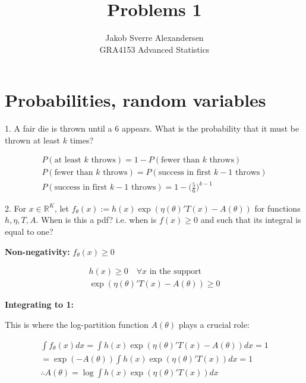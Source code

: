 \documentclass[10pt]{article}
\begin{document}
 
\title{Problems 1}
\author{Jakob Sverre Alexandersen\\
GRA4153 Advanced Statistics}
\maketitle

\tableofcontents
\newpage

\section{Probabilities, random variables}

1. A fair die is thrown until a 6 appears. What is the probability that 
it must be thrown at least $k$ times?

\begin{gather*}
    P(\text{at least $k$ throws}) = 1 - P(\text{fewer than $k$ throws}) \\
    P(\text{fewer than $k$ throws}) = P(\text{success in first $k-1$ throws}) \\
    P(\text{success in first $k-1$ throws}) = 1 - \Big(\frac{5}{6}\Big)^{k - 1}
\end{gather*}

\hfill 

2. For $x \in \mathbb{R}^K$, let $f_\theta(x) :=h(x) \exp(\eta(\theta)'T(x) - A(\theta))$ for functions $h, \eta, T, A$. When 
is this a pdf? i.e. when is $f(x) \geq 0$ and such that its integral is equal to one?

\textbf{Non-negativity: } $f_\theta(x) \geq 0$

\begin{gather*}
    h(x) \geq 0 \quad\forall x \text{ in the support}\\
    \exp(\eta(\theta)'T(x) - A(\theta)) \geq 0
\end{gather*}

\textbf{Integrating to 1: }

This is where the log-partition function $A(\theta)$ plays a crucial role:

\begin{gather*}
    \int f_\theta(x) dx = \int h(x) \exp (\eta(\theta)'T(x) - A(\theta)) dx = 1\\
    = \exp(-A(\theta)) \int h(x) \exp(\eta(\theta)'T(x)) dx = 1 \\
    \therefore A(\theta) = \log \int h(x) \exp(\eta(\theta)'T(x)) dx
\end{gather*}

\newpage
\end{document}
